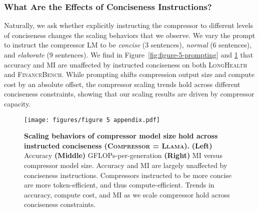 \documentclass{article} %
\begin{document}
\subsubsection{What Are the Effects of Conciseness Instructions?}
\label{sec:financebench-prompting-appendix}
Naturally, we ask whether explicitly instructing the compressor to different levels of conciseness changes the scaling behaviors that we observe. 
We vary the prompt to instruct the compressor LM to be \textit{concise} (3 sentences), \textit{normal} (6 sentences), and \textit{elaborate} (9 sentences). 
We find in Figure~\ref{fig:figure-5-prompting} and \ref{fig:figure-5-appendix} that accuracy and MI are unaffected by instructed conciseness on both \textsc{LongHealth} and \textsc{FinanceBench}.
While prompting shifts compression output size and compute cost by an absolute offset, the compressor scaling trends hold across different conciseness constraints, showing that our scaling results are driven by compressor capacity.

\begin{figure}[h!]
    \centering
    \texttt{[image: figures/figure 5 appendix.pdf]}
    \caption{\textbf{Scaling behaviors of compressor model size hold across instructed conciseness (\textsc{Compressor = Llama}).} 
    \textbf{(Left)} Accuracy \textbf{(Middle)} GFLOPs-per-generation \textbf{(Right)} MI versus compressor model size. 
    Accuracy and MI are largely unaffected by conciseness instructions. Compressors instructed to be more concise are more token-efficient, and thus compute-efficient. Trends in accuracy, compute cost, and MI as we scale compressor hold across conciseness constraints.}
    \label{fig:figure-5-appendix}
\end{figure}
\end{document}
